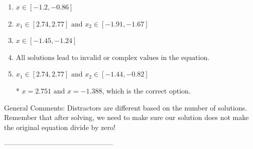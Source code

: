 \documentclass{article}[14pt]
\begin{document}
\begin{enumerate}[label=\Alph*.] 
\item $ x \in [-1.2,-0.86] $ 

  
\item $ x_1 \in [2.74, 2.77] \text{ and } x_2 \in [-1.91,-1.67] $ 

  
\item $ x \in [-1.45,-1.24] $ 

  
\item $ \text{All solutions lead to invalid or complex values in the equation.} $ 

  
\item $ x_1 \in [2.74, 2.77] \text{ and } x_2 \in [-1.44,-0.82] $ 

 * $x = 2.751 \text{ and } x = -1.388$, which is the correct option. 
\end{enumerate} 
 
General Comments: Distractors are different based on the number of solutions. Remember that after solving, we need to make sure our solution does not make the original equation divide by zero!

-----------------------------------------------
\end{document}

